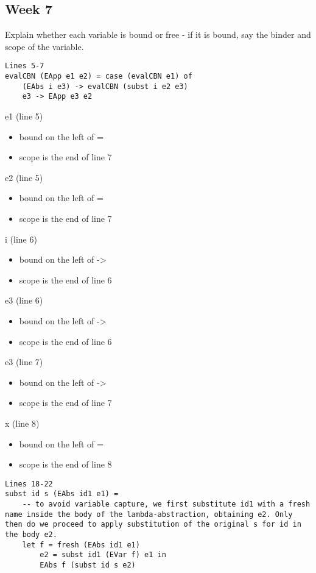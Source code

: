 \documentclass{article}
\theoremstyle{theorem}
\theoremstyle{definition}
\theoremstyle{remark}
\begin{document}
\subsection{Week 7}
Explain whether each variable is bound or free - if it is bound, say the binder and scope of the variable.
\begin{lstlisting}
Lines 5-7
evalCBN (EApp e1 e2) = case (evalCBN e1) of
    (EAbs i e3) -> evalCBN (subst i e2 e3)
    e3 -> EApp e3 e2
\end{lstlisting}
%

\indent
e1 (line 5)
\begin{itemize}
  \item bound on the left of =
  \item scope is the end of line 7
\end{itemize}

\indent
e2 (line 5)
\begin{itemize}
  \item bound on the left of =
  \item scope is the end of line 7
\end{itemize}

\indent
i (line 6)
\begin{itemize}
  \item bound on the left of ->
  \item scope is the end of line 6
\end{itemize}

\indent
e3 (line 6)
\begin{itemize}
  \item bound on the left of ->
  \item scope is the end of line 6
\end{itemize}

\indent
e3 (line 7)
\begin{itemize}
  \item bound on the left of ->
  \item scope is the end of line 7
\end{itemize}

\indent
x (line 8)
\begin{itemize}
  \item bound on the left of =
  \item scope is the end of line 8
\end{itemize}


\begin{lstlisting}
Lines 18-22
subst id s (EAbs id1 e1) = 
    -- to avoid variable capture, we first substitute id1 with a fresh name inside the body of the lambda-abstraction, obtaining e2. Only then do we proceed to apply substitution of the original s for id in the body e2.
    let f = fresh (EAbs id1 e1)
        e2 = subst id1 (EVar f) e1 in 
        EAbs f (subst id s e2)
\end{lstlisting}
%
\end{document}
